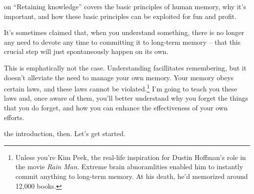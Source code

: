  on ``Retaining knowledge'' covers the basic
principles of human memory, why it's important, and how these basic principles can be exploited for fun and profit.

It's sometimes claimed that, when you understand something, there is no longer
any need to devote any time to committing it to long-term memory -- that this
crucial step will just spontaneously happen on its own.

This is emphatically not the case. Understanding facillitates remembering, but
it doesn't alleviate the need to manage your own memory. Your memory obeys
certain laws, and these laws cannot be violated.\footnote{Unless you're Kim
  Peek, the real-life inspiration for Dustin Hoffman's role in the movie \textit{Rain Man.} Extreme brain abnoramlities enabled him to instantly commit
  anything to long-term memory. At his death, he'd memorized around 12,000 books.} I'm going to teach you these laws and, once aware of
them, you'll better understand why you forget the things that you do forget, and
how you can enhance the effectiveness of your own efforts.

 the introduction, then. Let's get started.
